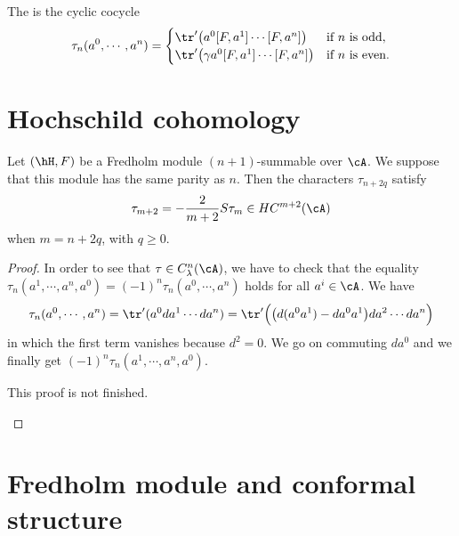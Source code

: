 The  is the cyclic cocycle
\begin{equation}
\tau_n(a^0,\cdots,a^{n})=
\begin{cases}
\tr'\big( a^0[F,a^1]\cdots[F,a^{n}] \big)&\text{if $n$ is odd},\\
\tr'\big( \gamma a^0[F,a^1]\cdots[F,a^{n}] \big)&\text{if $n$ is even}.
\end{cases}
\end{equation}

\section{Hochschild cohomology}

\begin{proposition}
Let $(\hH,F)$ be a Fredholm module $(n+1)$-summable over $\cA$. We suppose that this module has the same parity as $n$. Then the characters $\tau_{n+2q}$ satisfy
\begin{equation}
\tau_{m+2}=-\frac{ 2 }{ m+2 }S\tau_m\in HC^{m+2}(\cA)
\end{equation}
when $m=n+2q$, with $q\geq 0$.
\end{proposition}

\begin{proof}
In order to see that $\tau\in C^n_{\lambda}(\cA)$, we have to check that the equality $\tau_n(a^1,\cdots,a^{n},a^0)=(-1)^n\tau_n(a^0,\cdots,a^{n})$ holds for all $a^i\in\cA$. We have
\[ 
\tau_n(a^0,\cdots,a^{n})=\tr'(a^0da^1\cdots da^{n})=\tr'\Big( \big( d(a^0a^1)-da^0a^1 \big)da^2\cdots da^{n} \Big)
\]
in which the first term vanishes because $d^2=0$. We go on commuting $da^0$ and we finally get $(-1)^n\tau_n(a^1,\cdots,a^n,a^0)$.

\begin{probleme}
	This proof is not finished.
\end{probleme}

\end{proof}
\section{Fredholm module and conformal structure}

